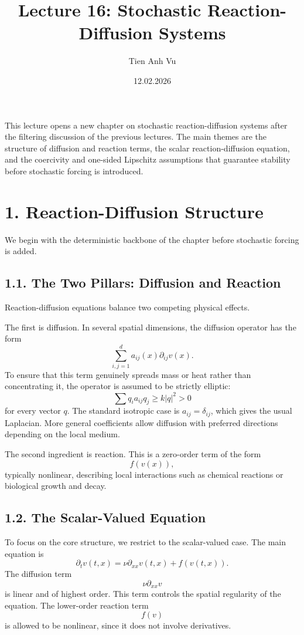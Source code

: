 \documentclass[11pt]{article}
\title{Lecture 16: Stochastic Reaction-Diffusion Systems}
\date{12.02.2026}
\author{Tien Anh Vu}
\theoremstyle{definition}
\theoremstyle{remark}
\begin{document}
\maketitle

This lecture opens a new chapter on stochastic reaction-diffusion systems after the filtering discussion of the previous lectures. The main themes are the structure of diffusion and reaction terms, the scalar reaction-diffusion equation, and the coercivity and one-sided Lipschitz assumptions that guarantee stability before stochastic forcing is introduced.

\section*{1. Reaction-Diffusion Structure}
We begin with the deterministic backbone of the chapter before stochastic forcing is added.

\subsection*{1.1. The Two Pillars: Diffusion and Reaction}
Reaction-diffusion equations balance two competing physical effects.

The first is diffusion. In several spatial dimensions, the diffusion operator has the form
\[
\sum_{i,j=1}^d a_{ij}(x)\partial_{ij}v(x).
\]
To ensure that this term genuinely spreads mass or heat rather than concentrating it, the operator is assumed to be strictly elliptic:
\[
\sum q_i a_{ij} q_j \ge k|q|^2>0
\]
for every vector \(q\). The standard isotropic case is \(a_{ij}=\delta_{ij}\), which gives the usual Laplacian. More general coefficients allow diffusion with preferred directions depending on the local medium.

The second ingredient is reaction. This is a zero-order term of the form
\[
f(v(x)),
\]
typically nonlinear, describing local interactions such as chemical reactions or biological growth and decay.

\subsection*{1.2. The Scalar-Valued Equation}
To focus on the core structure, we restrict to the scalar-valued case. The main equation is
\[
\partial_t v(t,x)=\nu\partial_{xx}v(t,x)+f(v(t,x)).
\]
The diffusion term
\[
\nu\partial_{xx}v
\]
is linear and of highest order. This term controls the spatial regularity of the equation. The lower-order reaction term
\[
f(v)
\]
is allowed to be nonlinear, since it does not involve derivatives.
\end{document}
